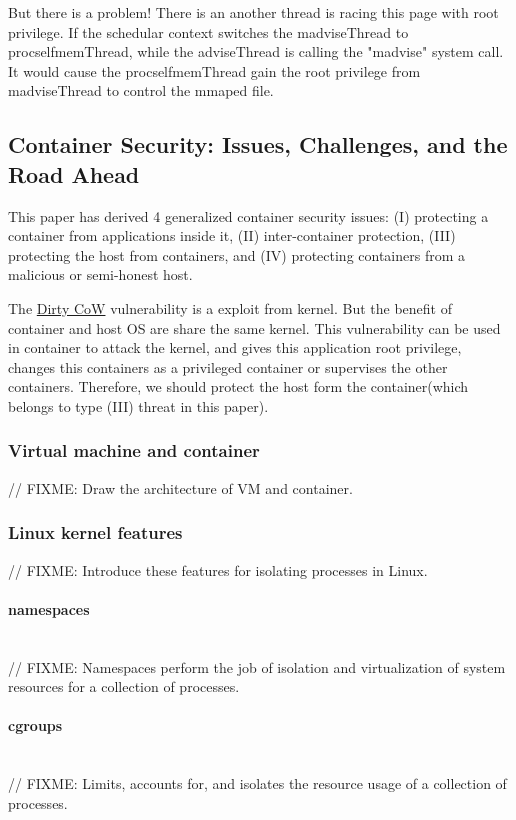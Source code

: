 \documentclass[12pt,a4paper,oneside,draft]{IEEEconf}
\begin{document}
But there is a problem! There is an another thread is racing this page with root privilege.
If the schedular context switches the madviseThread to procselfmemThread, while the
adviseThread is calling the "madvise" system call. It would cause the procselfmemThread
gain the root privilege from madviseThread to control the mmaped file.

\subsection{Container Security: Issues, Challenges, and the Road Ahead\cite{Road_Ahead}}
This paper has derived 4 generalized container security issues: (\RN{1}) protecting a
container from applications inside it, (\RN{2}) inter-container protection, (\RN{3})
protecting the host from containers, and (\RN{4}) protecting containers from a malicious
or semi-honest host.\cite{Road_Ahead}

The \hyperlink{dirty cow}{Dirty CoW} vulnerability is a exploit from kernel. But the benefit
of container and host OS are share the same kernel. This vulnerability can be used in
container to attack the kernel, and gives this application root privilege, changes this
containers as a privileged container or supervises the other containers. Therefore, we should
protect the host form the container(which belongs to type (\RN{3}) threat in this paper).

\subsubsection{Virtual machine and container}
// FIXME: Draw the architecture of VM and container.

\subsubsection{Linux kernel features}
// FIXME: Introduce these features for isolating processes in Linux.

\paragraph{namespaces}\mbox{}\\
// FIXME: Namespaces perform the job of isolation and virtualization of system resources
for a collection of processes.\cite{Road_Ahead}

\paragraph{cgroups}\mbox{}\\
// FIXME: Limits, accounts for, and isolates the resource usage of a collection of processes.
\cite{cgroup_wiki}
\end{document}
